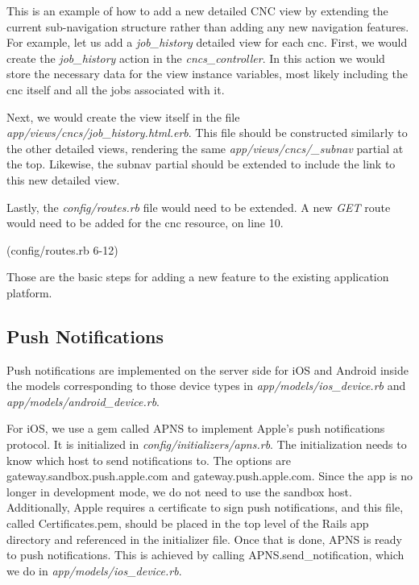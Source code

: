 \documentclass[12pt,letterpaper,titlepage]{article}
\begin{document}
This is an example of how to add a new detailed CNC view by extending the current sub-navigation structure rather than adding any new navigation features. For example, let us add a \textit{job\_history} detailed view for each cnc. First, we would create the \textit{job\_history} action in the \textit{cncs\_controller}. In this action we would store the necessary data for the view instance variables, most likely including the cnc itself and all the jobs associated with it.

Next, we would create the view itself in the file \textit{app/views/cncs/job\_history.html.erb}. This file should be constructed similarly to the other detailed views, rendering the same \textit{app/views/cncs/\_subnav} partial at the top. Likewise, the subnav partial should be extended to include the link to this new detailed view.

Lastly, the \textit{config/routes.rb} file would need to be extended. A new \textit{GET} route would need to be added for the cnc resource, on line 10.

(config/routes.rb 6-12)


Those are the basic steps for adding a new feature to the existing application platform.

\subsection{Push Notifications} \label{doc:PushNotifications}

Push notifications are implemented on the server side for iOS and Android inside the models corresponding to those device types in \textit{app/models/ios\_device.rb} and \textit{app/models/android\_device.rb}. 

For iOS, we use a gem called APNS to implement Apple's push notifications protocol. It is initialized in \textit{config/initializers/apns.rb}. The initialization needs to know which host to send notifications to. The options are gateway.sandbox.push.apple.com and gateway.push.apple.com. Since the app is no longer in development mode, we do not need to use the sandbox host. Additionally, Apple requires a certificate to sign push notifications, and this file, called Certificates.pem, should be placed in the top level of the Rails app directory and referenced in the initializer file. Once that is done, APNS is ready to push notifications. This is achieved by calling APNS.send\_notification, which we do in \textit{app/models/ios\_device.rb}.
\end{document}
